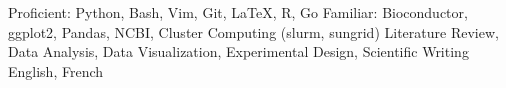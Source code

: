 \begin{cvskills}
    	    {Proficient: Python, Bash, Vim, Git, LaTeX, R, Go}
	\cvskill{}
            {Familiar: Bioconductor, ggplot2, Pandas, NCBI, Cluster Computing (slurm, sungrid)}
            {Literature Review, Data Analysis, Data Visualization, Experimental Design, Scientific Writing}
		    {English, French}
\end{cvskills}
